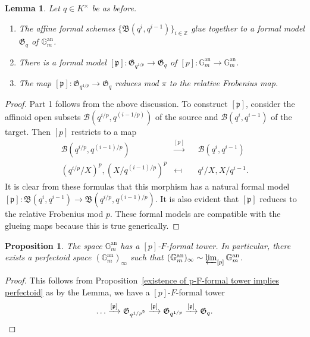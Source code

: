 \documentclass[10pt,oneside]{amsart}
\newtheorem{lemma}[theorem]{Lemma}
\newtheorem{proposition}[theorem]{Proposition}
\theoremstyle{definition}
\begin{document}
	\begin{lemma}\label{formal model of torus}
		Let $q\in K^\times$ be as before.
		\begin{enumerate} 
		\item 
		The affine formal schemes $\{\mathfrak B(q^i,q^{i-1})\}_{i\in\mathbb Z}$ glue together to a formal model $\mathfrak G_q$ of $\mathbb G_m^{\operatorname{an}}$.
		\item There is a formal model $[\mathfrak p]: \mathfrak G_{q^{1/p}}\rightarrow  \mathfrak G_q$ of $[p]:\mathbb G_m^{\operatorname{an}}\rightarrow \mathbb G_m^{\operatorname{an}}$.
		\item The map $[\mathfrak p]: \mathfrak G_{q^{1/p}}\rightarrow  \mathfrak G_q$ reduces mod $\pi$ to the relative Frobenius map.
		\end{enumerate}
	\end{lemma}
\begin{proof}
	Part 1 follows from the above discussion. To construct $[\mathfrak p]$, consider the affinoid open subsets $\mathcal B(q^{i/p},q^{(i-1/p)})$ of the source and  $\mathcal B(q^i,q^{i-1})$ of the target. Then $[p]$ restricts to a map
	\begin{equation}
	\begin{alignedat}{2} \label{torus explicit [p] map 1}
	\mathcal B(q^{i/p},q^{(i-1)/p})&\xrightarrow{[p]}&&\mathcal B(q^i,q^{i-1}) \\
(q^{i/p}/X)^p, (X/q^{(i-1)/p})^p&\mapsfrom&& 	q^i/X, X/q^{i-1}.
	\end{alignedat}
	\end{equation}
	It is clear from these formulas that this morphism has a natural formal model  $[\mathfrak p]:\mathfrak B(q^i,q^{i-1})\to \mathfrak B(q^{i/p},q^{(i-1)/p})$. It is also evident that $[\mathfrak p]$ reduces to the relative Frobenius mod $p$. 
	These formal models are compatible with the glueing maps because this is true generically.
	\end{proof}
	\begin{proposition}
		The space $\mathbb G_m^{\operatorname{an}}$ has a $[p]$-$F$-formal tower. In particular, there exists a perfectoid space $(\mathbb G_m^{\operatorname{an}})_\infty$ such that $(\mathbb G_m^{\operatorname{an}})_\infty \sim \varprojlim_{[p]} \mathbb G_m^{\operatorname{an}}$.
	\end{proposition}
	\begin{proof}
		This follows from  Proposition~\ref{existence of p-F-formal tower implies perfectoid} as by the Lemma, we have a $[p]$-$F$-formal tower
		\[\dots \xrightarrow{[\mathfrak p]} \mathfrak G_{q^{1/p^2}}\xrightarrow{[\mathfrak p]} \mathfrak G_{q^{1/p}}\xrightarrow{[\mathfrak p]} \mathfrak G_q.\qedhere \]
	\end{proof}
	
\end{document}
